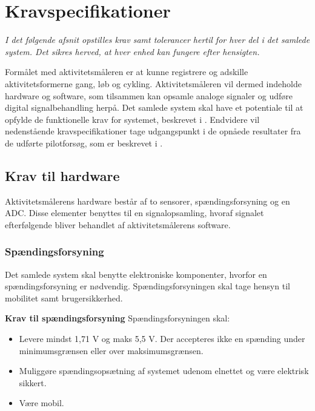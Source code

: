 \section{Kravspecifikationer}
\textit{I det følgende afsnit opstilles krav samt tolerancer hertil for hver del i det samlede system. Det sikres herved, at hver enhed kan fungere efter hensigten.}

Formålet med aktivitetsmåleren er at kunne registrere og adskille aktivitetsformerne gang, løb og cykling. Aktivitetsmåleren vil dermed indeholde hardware og software, som tilsammen kan opsamle analoge signaler og udføre digital signalbehandling herpå. Det samlede system skal have et potentiale til at opfylde de funktionelle krav for systemet, beskrevet i . Endvidere vil nedenstående kravspecifikationer tage udgangspunkt i de opnåede resultater fra de udførte pilotforsøg, som er beskrevet i .

\subsection{Krav til hardware}
Aktivitetsmålerens hardware består af to sensorer, spændingsforsyning og en ADC. Disse elementer benyttes til en signalopsamling, hvoraf signalet efterfølgende bliver behandlet af aktivitetsmålerens software.

\subsubsection{Spændingsforsyning}
Det samlede system skal benytte elektroniske komponenter, hvorfor en spændingsforsyning er nødvendig. Spændingsforsyningen skal tage hensyn til mobilitet samt brugersikkerhed.

\textbf{Krav til spændingsforsyning} \newline 
Spændingsforsyningen skal:
\begin{itemize}
	\item Levere mindst 1,71 V og maks 5,5 V. Der accepteres ikke en spænding under minimumsgrænsen eller over maksimumsgrænsen. %
	\item Muliggøre spændingsopsætning af systemet udenom elnettet og være elektrisk sikkert.
	\item Være mobil.
\end{itemize}

